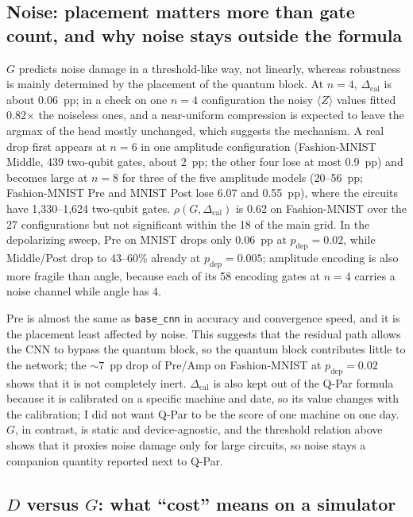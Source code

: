 \documentclass{ieeeaccess}
\newcommand{\pdep}{p_{\mathrm{dep}}}           %
\newcommand{\Dcal}{\Delta_{\mathrm{cal}}}
\begin{document}
\subsection{Noise: placement matters more than gate count, and why noise stays outside the formula}
\label{sec:disc-noise}

$G$ predicts noise damage in a threshold-like way, not linearly, whereas robustness is mainly determined by the placement of the quantum block. At $n = 4$, $\Dcal$ is about 0.06~pp; in a check on one $n = 4$ configuration the noisy $\langle Z\rangle$ values fitted 0.82$\times$ the noiseless ones, and a near-uniform compression is expected to leave the argmax of the head mostly unchanged, which suggests the mechanism. A real drop first appears at $n = 6$ in one amplitude configuration (Fashion-MNIST Middle, 439 two-qubit gates, about 2~pp; the other four lose at most 0.9~pp) and becomes large at $n = 8$ for three of the five amplitude models (20--56~pp; Fashion-MNIST Pre and MNIST Post lose 6.07 and 0.55~pp), where the circuits have 1,330--1,624 two-qubit gates. $\rho(G, \Dcal)$ is 0.62 on Fashion-MNIST over the 27 configurations but not significant within the 18 of the main grid. In the depolarizing sweep, Pre on MNIST drops only 0.06~pp at $\pdep = 0.02$, while Middle/Post drop to 43--60\% already at $\pdep = 0.005$; amplitude encoding is also more fragile than angle, because each of its 58 encoding gates at $n = 4$ carries a noise channel while angle has 4.

Pre is almost the same as \texttt{base\_cnn} in accuracy and convergence speed, and it is the placement least affected by noise. This suggests that the residual path allows the CNN to bypass the quantum block, so the quantum block contributes little to the network; the ${\sim}7$~pp drop of Pre/Amp on Fashion-MNIST at $\pdep = 0.02$ shows that it is not completely inert. $\Dcal$ is also kept out of the Q-Par formula because it is calibrated on a specific machine and date, so its value changes with the calibration; I did not want Q-Par to be the score of one machine on one day. $G$, in contrast, is static and device-agnostic, and the threshold relation above shows that it proxies noise damage only for large circuits, so noise stays a companion quantity reported next to Q-Par.

\subsection{\texorpdfstring{$D$ versus $G$}{D versus G}: what ``cost'' means on a simulator}
\label{sec:disc-cost}
\end{document}
